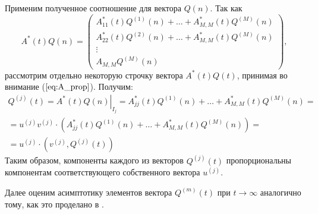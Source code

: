 \documentclass[12pt]{article}
\begin{document}
Применим полученное соотношение для вектора $Q(n)$. Так как
\begin{equation}
	A^*(t)Q(n) =
	\begin{pmatrix}
		A_{11}^*(t)Q^{(1)}(n) + \ldots + A_{M,M}^*(t)Q^{(M)}(n) \\
		A_{22}^*(t)Q^{(2)}(n) + \ldots + A_{M,M}^*(t)Q^{(M)}(n) \\
		\vdots \\
		A_{M,M}Q^{(M)}(n)
	\end{pmatrix},
\end{equation}		
рассмотрим отдельно некоторую строчку вектора $A^*(t)Q(t)$, принимая во внимание ($\ref{eq:A_prop}$). Получим:
\begin{multline}
	Q^{(j)}(t) = \left. A^*(t)Q(n) \right|_{I_j} = A^*_{jj}(t)Q^{(1)}(n) + \ldots + A_{M,M}^*(t)Q^{(M)}(n) = \\
	= u^{(j)} v^{(j)} \cdot \left( A^*_{jj}(t)Q^{(1)}(n) + \ldots + A_{M,M}^*(t)Q^{(M)}(n) \right) = \\
	= u^{(j)} \cdot \left( v^{(j)}, Q^{(j)}(t) \right)
\end{multline}
Таким образом, компоненты каждого из векторов $Q^{(j)}(t)$ про\-пор\-ци\-о\-наль\-ны компонентам соответствующего собственного вектора $u^{(j)}$.

Далее оценим асимптотику элементов вектора $Q^{(m)}(t)$ при $t \rightarrow \infty$ ана\-ло\-гич\-но тому, как это проделано в \cite{lit:borisov_2gr}.
\end{document}
